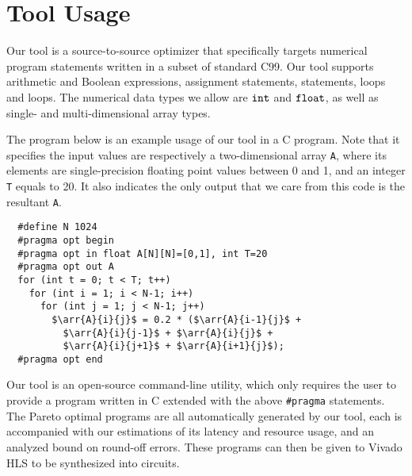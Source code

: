 \section{Tool Usage}
\label{sec:usage}


Our tool is a source-to-source optimizer that specifically targets numerical
program statements written in a subset of standard C99.  Our tool
supports arithmetic and Boolean expressions, assignment statements, \iflit{}
statements, \whilelit{} loops and \forlit{} loops.  The numerical data types we
allow are $\texttt{int}$ and $\texttt{float}$, as well as single- and multi-dimensional
array types.

The program below is an example usage of our tool in a C program.  Note
that it specifies the input values are respectively a two-dimensional array
\verb|A|, where its elements are single-precision floating point values between
0 and 1, and an integer \verb|T| equals to 20.  It also indicates the only
output that we care from this code is the resultant \verb|A|.
\begin{lstlisting}
  #define N 1024
  #pragma opt begin
  #pragma opt in float A[N][N]=[0,1], int T=20
  #pragma opt out A
  for (int t = 0; t < T; t++)
    for (int i = 1; i < N-1; i++)
      for (int j = 1; j < N-1; j++)
        $\arr{A}{i}{j}$ = 0.2 * ($\arr{A}{i-1}{j}$ +
          $\arr{A}{i}{j-1}$ + $\arr{A}{i}{j}$ +
          $\arr{A}{i}{j+1}$ + $\arr{A}{i+1}{j}$);
  #pragma opt end
\end{lstlisting}

Our tool is an open-source command-line utility, which only requires the user
to provide a program written in C extended with the above \verb|#pragma|
statements.  The Pareto optimal programs are all automatically generated by
our tool, each is accompanied with our estimations of its latency and resource
usage, and an analyzed bound on round-off errors.  These programs can then be
given to Vivado HLS to be synthesized into circuits.
